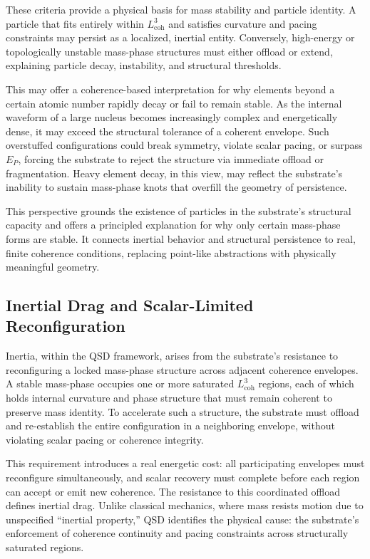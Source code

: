\documentclass[entropy,article,submit,pdftex,oneauthor]{Definitions/mdpi}
\begin{document}
These criteria provide a physical basis for mass stability and particle identity. A particle that fits entirely within \texorpdfstring{\( L_{\text{coh}}^3 \)}{Lcoh\^{}3} and satisfies curvature and pacing constraints may persist as a localized, inertial entity. Conversely, high-energy or topologically unstable mass-phase structures must either offload or extend, explaining particle decay, instability, and structural thresholds.

This may offer a coherence-based interpretation for why elements beyond a certain atomic number rapidly decay or fail to remain stable. As the internal waveform of a large nucleus becomes increasingly complex and energetically dense, it may exceed the structural tolerance of a coherent envelope. Such overstuffed configurations could break symmetry, violate scalar pacing, or surpass \( E_P \), forcing the substrate to reject the structure via immediate offload or fragmentation. Heavy element decay, in this view, may reflect the substrate’s inability to sustain mass-phase knots that overfill the geometry of persistence.

This perspective grounds the existence of particles in the substrate’s structural capacity and offers a principled explanation for why only certain mass-phase forms are stable. It connects inertial behavior and structural persistence to real, finite coherence conditions, replacing point-like abstractions with physically meaningful geometry.

\subsection{Inertial Drag and Scalar-Limited Reconfiguration}
\label{sec:coherent-momentum-quantum}
Inertia, within the QSD framework, arises from the substrate's resistance to reconfiguring a locked mass-phase structure across adjacent coherence envelopes. A stable mass-phase occupies one or more saturated \texorpdfstring{\( L_{\text{coh}}^3 \)}{Lcoh\^{}3} regions, each of which holds internal curvature and phase structure that must remain coherent to preserve mass identity. To accelerate such a structure, the substrate must offload and re-establish the entire configuration in a neighboring envelope, without violating scalar pacing or coherence integrity.

This requirement introduces a real energetic cost: all participating envelopes must reconfigure simultaneously, and scalar recovery must complete before each region can accept or emit new coherence. The resistance to this coordinated offload defines inertial drag. Unlike classical mechanics, where mass resists motion due to unspecified “inertial property,” QSD identifies the physical cause: the substrate’s enforcement of coherence continuity and pacing constraints across structurally saturated regions.
\end{document}
